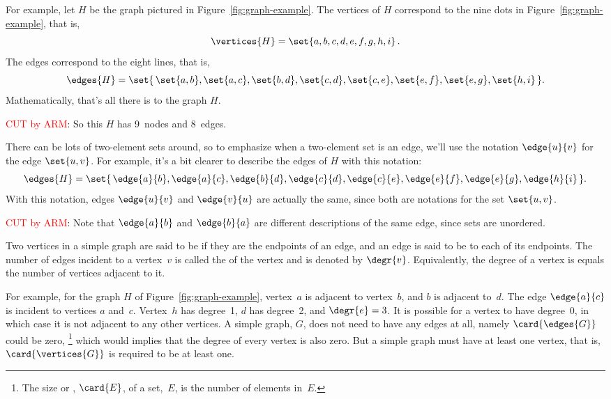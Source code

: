 For example, let $H$ be the graph pictured in
Figure~\ref{fig:graph-example}.  The vertices of $H$ correspond to the
nine dots in Figure~\ref{fig:graph-example}, that is,
\[
\vertices{H} =  \set{a, b, c, d, e, f, g, h, i}\, .
\]
The edges correspond to the eight lines, that is,
\[
\edges{H} =  \set{\, \set{a, b}, \set{a, c}, \set{b, d}, \set{c, d},
              \set{c, e}, \set{e, f}, \set{e, g}, \set{h, i} \,}.
\]
Mathematically, that's all there is to the graph $H$.
\begin{editingnotes}
\textcolor{red}{CUT by ARM}: So this $H$ has 9~nodes and 8~edges.
\end{editingnotes}

 There can be lots of two-element
sets around, so to emphasize when a two-element set is an edge, we'll
use the notation $\edge{u}{v}$ for the edge $\set{u,v}$.  For example,
it's a bit clearer to describe the edges of $H$ with this notation:
\[
\edges{H} =  \set{\, \edge{a}{b}, \edge{a}{c}, \edge{b}{d}, \edge{c}{d},
              \edge{c}{e}, \edge{e}{f}, \edge{e}{g}, \edge{h}{i} \,}.
\]
With this notation, edges $\edge{u}{v}$ and $\edge{v}{u}$ are actually the
same, since both are notations for the set $\set{u,v}$.

\begin{editingnotes}
\textcolor{red}{CUT by ARM}: Note that $\edge{a}{b}$
  and $\edge{b}{a}$ are different descriptions of the same edge, since
  sets are unordered.
\end{editingnotes}

\begin{definition}
Two vertices in a simple graph are said to be  if they
 are the endpoints of an edge, and an edge is
said to be  to each of its endpoints.  The number of
edges incident to a vertex~$v$ is called the  of the
vertex and is denoted by $\degr{v}$.  Equivalently, the degree of a
vertex is equals the number of vertices adjacent to it.
\end{definition}
For example, for the graph $H$ of Figure~\ref{fig:graph-example},
vertex~$a$ is adjacent to vertex~$b$, and $b$ is adjacent to~$d$.  The
edge $\edge{a}{c}$ is incident to vertices $a$ and~$c$.  Vertex~$h$
has degree~1, $d$ has degree~2, and $\degr{e} = 3$.  It is possible
for a vertex to have degree~0, in which case it is not adjacent to any
other vertices.  A simple graph, $G$, does not need to have any edges
at all, namely $\card{\edges{G}}$ could be zero,
\footnote{The size or , $\card{E}$, of a set,~$E$,
  is the number of elements in~$E$.}  which would implies that the
degree of every vertex is also zero.  But a simple graph must have at
least one vertex, that is, $\card{\vertices{G}}$ is required to be at
least one.

